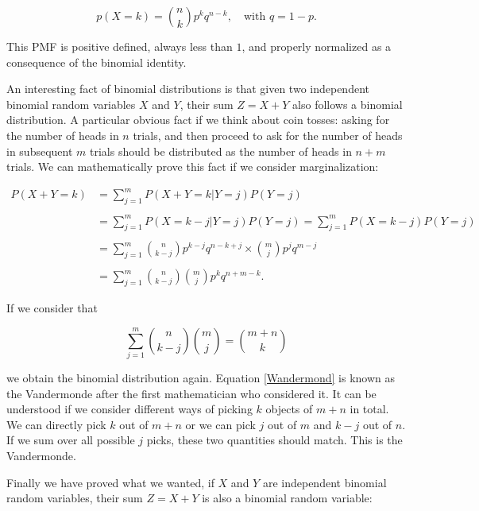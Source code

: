 \documentclass[12pt]{article}
\begin{document}
\begin{equation}
p(X = k) = {n \choose k} p^{k} q^{n - k},
\quad
\mbox{with }
q = 1 - p.
\end{equation}

\noindent
This PMF is positive defined, always less than $1$, and properly
normalized as a consequence of the binomial identity.

An interesting fact of binomial distributions is that given two 
independent binomial random variables $X$ and $Y$, their sum
$Z = X + Y$ also follows a binomial distribution.
A particular obvious fact if we think about coin tosses:
asking for the number of heads in $n$ trials, and then proceed
to ask for the number of heads in subsequent $m$ trials should
be distributed as the number of heads in $n + m$ trials.
We can mathematically prove this fact if we consider marginalization:

\begin{align}
P(X + Y = k) &= 
\sum_{j = 1}^{m} P(X + Y = k | Y = j) P(Y = j) 
\nonumber \\
\nonumber \\
&= \sum_{j = 1}^{m} P(X = k - j | Y = j) P(Y = j) =
\sum_{j = 1}^{m} P(X = k - j) P(Y = j) 
\nonumber \\
\nonumber \\
&= \sum_{j = 1}^{m} {n \choose k - j} p^{k-j} q^{n - k + j} \times
{m \choose j} p^{j} q^{m - j}
\nonumber \\
\nonumber \\
&= 
\sum_{j = 1}^{m} {n \choose k - j} {m \choose j} p^{k} q^{n + m -k}.
\end{align}

\noindent
If we consider that

\begin{equation} \label{Wandermond}
\sum_{j = 1}^{m} 
{n \choose k - j}
{m \choose j }
= 
{m + n \choose k}
\end{equation}

\noindent
we obtain the binomial distribution again.
Equation \eqref{Wandermond} is known as the Vandermonde
after the first mathematician who considered it.
It can be understood if we consider different ways of picking
$k$ objects of $m + n$ in total.
We can directly pick $k$ out of $m + n$ or we can pick $j$ out of $m$ and 
$k - j$ out of $n$. If we sum over all possible $j$ picks, these
two quantities should match. This is the Vandermonde.

Finally we have proved what we wanted, if $X$ and $Y$ are independent
binomial random variables, their sum $Z = X + Y$ is also a binomial random variable:
\end{document}
